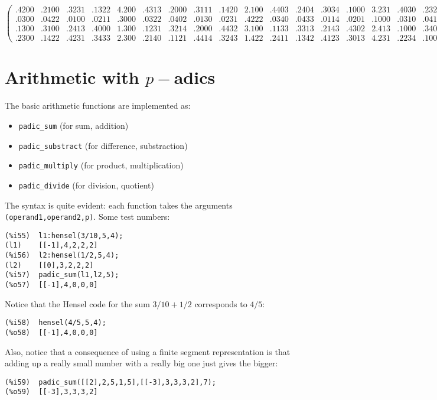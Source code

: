 \documentclass[fleqn]{cas-sc}
\begin{document}
\begin{sideways}
\begin{minipage}{\textheight}
\[\begin{pmatrix}
.4200 & .2100 & .3231 & .1322 & 4.200 & .4313 & .2000 & .3111 & .1420 & 2.100 & .4403 & .2404 & .3034 & .1000 & 3.231 & .4030 & .2323\\
.0300 & .0422 & .0100 & .0211 & .3000 & .0322 & .0402 & .0130 & .0231 & .4222 & .0340 & .0433 & .0114 & .0201 & .1000 & .0310 & .0412\\
.1300 & .3100 & .2413 & .4000 & 1.300 & .1231 & .3214 & .2000 & .4432 & 3.100 & .1133 & .3313 & .2143 & .4302 & 2.413 & .1000 & .3401\\
.2300 & .1422 & .4231 & .3433 & 2.300 & .2140 & .1121 & .4414 & .3243 & 1.422 & .2411 & .1342 & .4123 & .3013 & 4.231 & .2234 & .1000
\end{pmatrix}
\]
\end{minipage}
\end{sideways}


\section{Arithmetic with $p-$adics}\label{sec4}

\noindent The basic arithmetic functions are implemented as:
\begin{itemize}
	\item  \texttt{padic\_sum} (for sum, addition)
	\item  \texttt{padic\_substract} (for difference, substraction)
	\item  \texttt{padic\_multiply} (for product, multiplication)
	\item  \texttt{padic\_divide} (for division, quotient)
\end{itemize}

The syntax is quite evident: each function takes the arguments
\texttt{(operand1,operand2,p)}.
Some test numbers:
\begin{verbatim}
(%i55)	l1:hensel(3/10,5,4);
(l1)	[[-1],4,2,2,2]
(%i56)	l2:hensel(1/2,5,4);
(l2)	[[0],3,2,2,2]
(%i57)	padic_sum(l1,l2,5);
(%o57)	[[-1],4,0,0,0]
\end{verbatim}

Notice that the Hensel code for the sum $3/10+1/2$ corresponds to $4/5$:
\begin{verbatim}
(%i58)	hensel(4/5,5,4);
(%o58)	[[-1],4,0,0,0]
\end{verbatim}

Also, notice that a consequence of using a finite segment representation is that
adding up a really small number with a really big one just gives the bigger:
\begin{verbatim}
(%i59)	padic_sum([[2],2,5,1,5],[[-3],3,3,3,2],7);
(%o59)	[[-3],3,3,3,2]
\end{verbatim}
\end{document}
